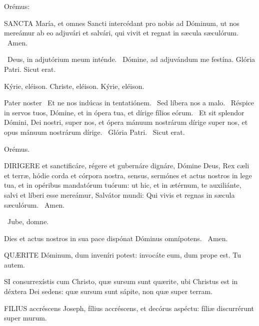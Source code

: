  Orémus:


\lettrine[lines=2]{S}{ANCTA} María, et omnes Sancti intercédant pro nobis ad Dóminum, ut nos mereámur ab eo adjuvári et salvári, qui vivit et regnat in sæcula sæculórum. \R\ Amen.

\V\ Deus, in adjutórium meum inténde. \R\ Dómine, ad adjuvándum me festína.  Glória Patri. Sicut erat.

Kýrie, eléison. Christe, eléison. Kýrie, eléison.

Pater noster  \V\ Et ne nos indúcas in tentatiónem. \R\ Sed líbera nos a malo. \V\ Réspice in servos tuos, Dómine, et in ópera tua, et dírige fílios eórum. \R\ Et sit splendor Dómini, Dei nostri, super nos, et ópera mánuum nostrárum dírige super nos, et opus mánuum nostrárum dírige. \V\ Glória Patri. \R\ Sicut erat.

Orémus. 

\lettrine[lines=2]{D}{IRIGERE} et sanctificáre, régere et gubernáre dignáre, Dómine Deus, Rex cæli et terræ, hódie corda et córpora nostra, sensus, sermónes et actus nostros in lege tua, et in opéribus mandatórum tuórum: ut hic, et in ætérnum, te auxiliánte, salvi et líberi esse mereámur, Salvátor mundi: Qui vivis et regnas in sæcula sæculórum. \R\ Amen.

\V\ Jube, domne.

 Dies et actus nostros in sua pace dispónat Dóminus omnípotens. \R\ Amen.



\lettrine[lines=2]{Q}{UÆRITE} Dóminum, dum inveníri potest: invocáte eum, dum prope est. Tu autem.


\lettrine[lines=2]{S}{I} consurrexístis cum Christo, quæ sursum sunt quærite, ubi Christus est in déxtera Dei sedens: quæ sursum sunt sápite, non quæ super terram.



\lettrine[lines=2]{F}{ILIUS} accréscens Joseph, fílius accréscens, et decórus aspéctu: fíliæ discurrérunt super murum.


